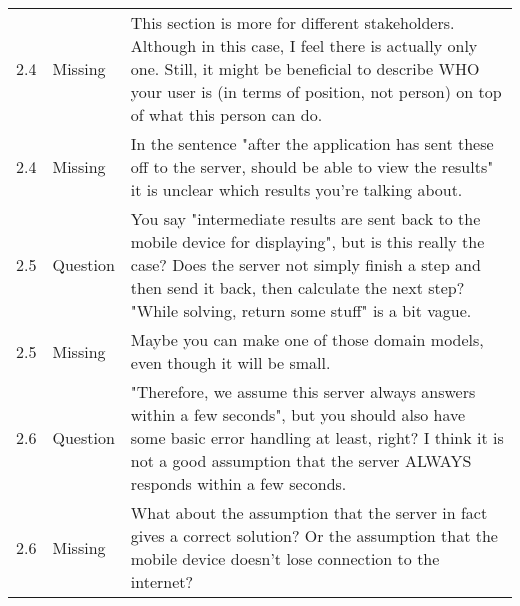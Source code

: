 \begin{longtable}{l|l|p{}}
2.4 & Missing & This section is more for different stakeholders. Although in this case, I feel there is actually only one. Still, it might be beneficial to describe WHO your user is (in terms of position, not person) on top of what this person can do. \\
2.4 & Missing & In the sentence "after the application has sent these off to the server, should be able to view the results" it is unclear which results you're talking about. \\
2.5 & Question & You say "intermediate results are sent back to the mobile device for displaying", but is this really the case? Does the server not simply finish a step and then send it back, then calculate the next step? "While solving, return some stuff" is a bit vague. \\
2.5 & Missing & Maybe you can make one of those domain models, even though it will be small. \\
2.6 & Question & "Therefore, we assume this server always answers within a few seconds", but you should also have some basic error handling at least, right? I think it is not a good assumption that the server ALWAYS responds within a few seconds.  \\
2.6 & Missing & What about the assumption that the server in fact gives a correct solution? Or the assumption that the mobile device doesn't lose connection to the internet? \\
\end{longtable}

